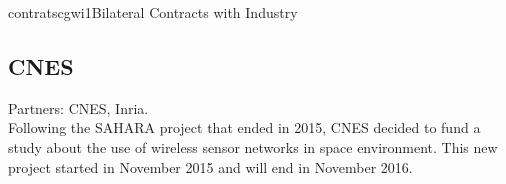 \documentclass{ra2016}
\begin{document}
%






\begin{module}{contrats}{cgwi1}{Bilateral Contracts with Industry}

\subsection{CNES}

\begin{participants}
\end{participants}

Partners: CNES, Inria.\\

Following the SAHARA project that ended in 2015, CNES decided to fund a study about the use of wireless sensor networks in space environment.
This new project started in November 2015 and will end in November 2016.

\end{module}
\end{document}
